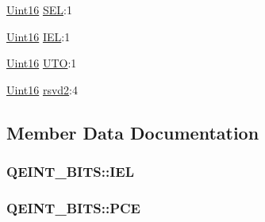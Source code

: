 \begin{DoxyCompactItemize}
\item 
\hyperlink{_d_s_p2833x___device_8h_a59a9f6be4562c327cbfb4f7e8e18f08b}{Uint16} \hyperlink{struct_q_e_i_n_t___b_i_t_s_a54d146af53fecb82e3ec7e910e81f6f3}{S\+E\+L}\+:1
\item 
\hyperlink{_d_s_p2833x___device_8h_a59a9f6be4562c327cbfb4f7e8e18f08b}{Uint16} \hyperlink{struct_q_e_i_n_t___b_i_t_s_aaa68335ac4fd789e6cd3f3b65f8c664a}{I\+E\+L}\+:1
\item 
\hyperlink{_d_s_p2833x___device_8h_a59a9f6be4562c327cbfb4f7e8e18f08b}{Uint16} \hyperlink{struct_q_e_i_n_t___b_i_t_s_aa0a1f958f8887863c17bc28e7522e991}{U\+T\+O}\+:1
\item 
\hyperlink{_d_s_p2833x___device_8h_a59a9f6be4562c327cbfb4f7e8e18f08b}{Uint16} \hyperlink{struct_q_e_i_n_t___b_i_t_s_a2ed45aa9578d43d3cb8227bb2632a935}{rsvd2}\+:4
\end{DoxyCompactItemize}


\subsection{Member Data Documentation}
\hypertarget{struct_q_e_i_n_t___b_i_t_s_aaa68335ac4fd789e6cd3f3b65f8c664a}{}
\subsubsection[{I\+E\+L}]{ Q\+E\+I\+N\+T\+\_\+\+B\+I\+T\+S\+::\+I\+E\+L}\label{struct_q_e_i_n_t___b_i_t_s_aaa68335ac4fd789e6cd3f3b65f8c664a}
\hypertarget{struct_q_e_i_n_t___b_i_t_s_a5db62f424c4fde37d59384958ffe227e}{}
\subsubsection[{P\+C\+E}]{ Q\+E\+I\+N\+T\+\_\+\+B\+I\+T\+S\+::\+P\+C\+E}\label{struct_q_e_i_n_t___b_i_t_s_a5db62f424c4fde37d59384958ffe227e}
\hypertarget{struct_q_e_i_n_t___b_i_t_s_a01e22f32cc1085eb10a0b6f7926338a7}{}
